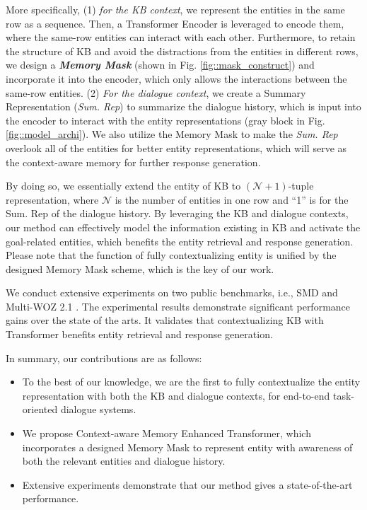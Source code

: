 \documentclass[11pt]{article}
\begin{document}
More specifically, (1) \textit{for the KB context}, we represent the entities in the same row as a sequence. Then, a Transformer Encoder \cite{vaswani-2017-attention} is leveraged to encode them, where the same-row entities can interact with each other. Furthermore, to retain the structure of KB and avoid the distractions from the entities in different rows, we design a \textit{\textbf{Memory Mask}} (shown in Fig. \ref{fig::mask_construct}) and incorporate it into the encoder, which only allows the interactions between the same-row entities.
(2) \textit{For the dialogue context}, we create a Summary Representation (\textit{Sum. Rep}) to summarize the dialogue history, which is input into the encoder to interact with the entity representations (gray block in Fig. \ref{fig::model_archi}). We also utilize the Memory Mask to make the \textit{Sum. Rep} overlook all of the entities for better entity representations, which will serve as the context-aware memory for further response generation.

By doing so, we essentially extend the entity of KB to $(\mathcal{N}+1)$-tuple representation, where $\mathcal{N}$ is the number of entities in one row and ``1'' is for the Sum. Rep of the dialogue history.
By leveraging the KB and dialogue contexts, our method can effectively model the information existing in KB and activate the goal-related entities, which benefits the entity retrieval and response generation.
Please note that the function of fully contextualizing entity is unified by the designed Memory Mask scheme, which is the key of our work. 


We conduct extensive experiments on two public benchmarks, i.e., SMD \cite{eric-etal-2017-key, madotto-etal-2018-mem2seq} and Multi-WOZ 2.1 \cite{budzianowski-etal-2018-multiwoz, yang-etal-2020-graphdialog}. 
The experimental results demonstrate significant performance gains over the state of the arts. It validates that contextualizing KB with Transformer benefits entity retrieval and response generation.

In summary, our contributions are as follows:
\begin{itemize}
    \item To the best of our knowledge, we are the first to fully contextualize the entity representation with both the KB and dialogue contexts, for end-to-end task-oriented dialogue systems.
    \item We propose Context-aware Memory Enhanced Transformer, which incorporates a designed Memory Mask to represent entity with awareness of both the relevant entities and dialogue history.
    \item Extensive experiments demonstrate that our method gives a state-of-the-art performance.
\end{itemize}
\end{document}
